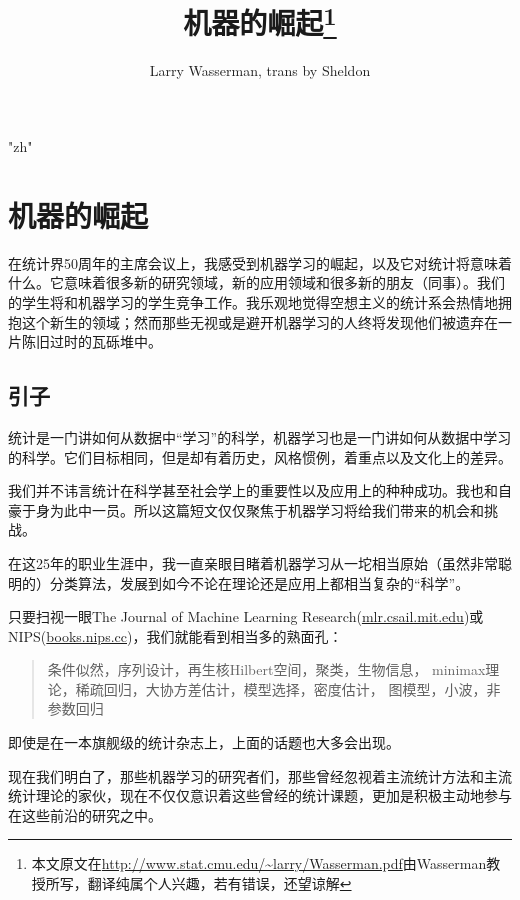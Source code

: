 \documentclass[]{article}
\begin{document}
\setmainfont{楷体}
\XeTeXlinebreaklocale "zh"
\newcommand{\EE}{ {\mathbb{E}} }
\newcommand{\RR}{ {\mathbb{R}} }
\newcommand{\PP}{ {\mathcal{P}} }
\newcommand{\UU}{ {\mathcal{U}} }
\newcommand{\LL}{ {\mathcal{L}} }

\title{机器的崛起\footnote{本文原文在\url{http://www.stat.cmu.edu/~larry/Wasserman.pdf}由Wasserman教授所写，翻译纯属个人兴趣，若有错误，还望谅解}}
\author{Larry Wasserman, trans by Sheldon}
\date{}
\maketitle

\section{机器的崛起}

在统计界50周年的主席会议上，我感受到机器学习的崛起，以及它对统计将意味着什么。它意味着很多新的研究领域，新的应用领域和很多新的朋友（同事）。我们的学生将和机器学习的学生竞争工作。我乐观地觉得空想主义的统计系会热情地拥抱这个新生的领域；然而那些无视或是避开机器学习的人终将发现他们被遗弃在一片陈旧过时的瓦砾堆中。

\subsection{引子}

统计是一门讲如何从数据中``学习''的科学，机器学习也是一门讲如何从数据中学习的科学。它们目标相同，但是却有着历史，风格惯例，着重点以及文化上的差异。

我们并不讳言统计在科学甚至社会学上的重要性以及应用上的种种成功。我也和自豪于身为此中一员。所以这篇短文仅仅聚焦于机器学习将给我们带来的机会和挑战。

在这25年的职业生涯中，我一直亲眼目睹着机器学习从一坨相当原始（虽然非常聪明的）分类算法，发展到如今不论在理论还是应用上都相当复杂的``科学''。

只要扫视一眼The Journal of Machine Learning Research(\url{mlr.csail.mit.edu})或NIPS(\url{books.nips.cc})，我们就能看到相当多的熟面孔：
\begin{quote} 
    条件似然，序列设计，再生核Hilbert空间，聚类，生物信息，
    minimax理论，稀疏回归，大协方差估计，模型选择，密度估计，
    图模型，小波，非参数回归
\end{quote}
即使是在一本旗舰级的统计杂志上，上面的话题也大多会出现。

现在我们明白了，那些机器学习的研究者们，那些曾经忽视着主流统计方法和主流统计理论的家伙，现在不仅仅意识着这些曾经的统计课题，更加是积极主动地参与在这些前沿的研究之中。
\end{document}
